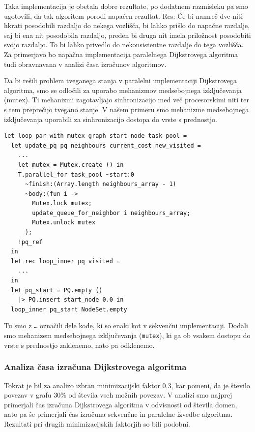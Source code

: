 \documentclass[fin1, tisk]{fmfdelo}
\begin{document}
Taka implementacija je obetala dobre rezultate, po dodatnem razmisleku pa smo ugotovili, da tak algoritem porodi napačen rezultat.
Res: Če bi namreč dve niti hkrati posodobili razdaljo do nekega vozlišča, bi lahko prišlo do napačne razdalje, saj bi ena nit
posodobila razdaljo, preden bi druga nit imela priložnost posodobiti svojo razdaljo. To bi lahko privedlo do nekonsistentne razdalje
do tega vozlišča. Za primerjavo bo napačna implementacija paralelnega Dijkstrovega algoritma tudi obravnavana v analizi časa izračunov algoritmov.

Da bi rešili problem tveganega stanja v paralelni implementaciji Dijkstrovega algoritma, smo se odločili za uporabo mehanizmov medsebojnega izključevanja (mutex).
Ti mehanizmi zagotavljajo sinhronizacijo med več procesorskimi niti ter s tem preprečijo tvegano stanje. V našem primeru smo mehanizme medsebojnega
izključevanja uporabili za sinhronizacijo dostopa do vrste s prednostjo.

\begin{lstlisting}
let loop_par_with_mutex graph start_node task_pool =
  let update_pq pq neighbours current_cost new_visited =
    ...
    let mutex = Mutex.create () in
    T.parallel_for task_pool ~start:0
      ~finish:(Array.length neighbours_array - 1)
      ~body:(fun i -> 
        Mutex.lock mutex;
        update_queue_for_neighbor i neighbours_array;
        Mutex.unlock mutex
      );
    !pq_ref
  in
  let rec loop_inner pq visited =
    ...
  in
  let pq_start = PQ.empty () 
    |> PQ.insert start_node 0.0 in
  loop_inner pq_start NodeSet.empty
\end{lstlisting}

Tu smo z \texttt{\dots} označili dele kode, ki so enaki kot v sekvenčni implementaciji. 
Dodali smo mehanizem medsebojnega izključevanja (\texttt{mutex}), ki ga ob vsakem dostopu do vrste s prednostjo zaklenemo, nato pa odklenemo.

\subsubsection{Analiza časa izračuna Dijkstrovega algoritma}

Tokrat je bil za analizo izbran minimizacijski faktor $0.3$, kar pomeni, da je število povezav v grafu $30\%$ od števila vseh
možnih povezav. V analizi smo najprej primerjali čas izračuna Dijkstrovega algoritma v odvisnosti od števila domen,
nato pa še primerjali čas izračuna sekvenčne in paralelne izvedbe algoritma. Rezultati pri drugih minimizacijskih
faktorjih so bili podobni.
\end{document}
